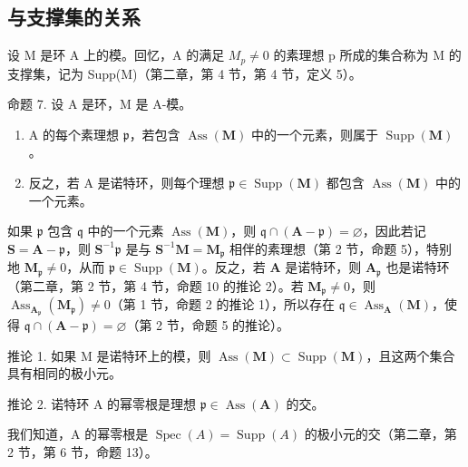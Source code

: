 \subsection{与支撑集的关系}

设 M 是环 A 上的模。回忆，A 的满足 \(M_{p} \neq 0\) 的素理想 p 所成的集合称为 M 的支撑集，记为 Supp(M)（第二章，第 4 节，第 4 节，定义 5）。

命题 7. 设 A 是环，M 是 A-模。

\begin{enumerate}
\def\labelenumi{(\roman{enumi})}
\item
A 的每个素理想 \(\mathfrak{p}\)，若包含 \(\operatorname{Ass}(\mathbf{M})\) 中的一个元素，则属于 \(\operatorname{Supp}(\mathbf{M})\)。
\item
反之，若 A 是诺特环，则每个理想 \(\mathfrak{p} \in \operatorname{Supp}(\mathbf{M})\) 都包含 \(\operatorname{Ass}(\mathbf{M})\) 中的一个元素。
\end{enumerate}

如果 \(\mathfrak{p}\) 包含 \(\mathfrak{q}\) 中的一个元素 \(\operatorname{Ass}(\mathbf{M})\)，则 \(\mathfrak{q} \cap (\mathbf{A} - \mathfrak{p}) = \varnothing\)，因此若记 \(\mathbf{S} = \mathbf{A} - \mathfrak{p}\)，则 \(\mathbf{S}^{-1}\mathfrak{p}\) 是与 \(\mathbf{S}^{-1}\mathbf{M} = \mathbf{M}_{\mathfrak{p}}\) 相伴的素理想（第 2 节，命题 5），特别地 \(\mathbf{M}_{\mathfrak{p}} \neq 0\)，从而 \(\mathfrak{p} \in \operatorname{Supp}(\mathbf{M})\)。反之，若 \(\mathbf{A}\) 是诺特环，则 \(\mathbf{A}_{\mathfrak{p}}\) 也是诺特环（第二章，第 2 节，第 4 节，命题 10 的推论 2）。若 \(\mathbf{M}_{\mathfrak{p}} \neq 0\)，则 \(\operatorname{Ass}_{\mathbf{A}_{\mathfrak{p}}}(\mathbf{M}_{\mathfrak{p}}) \neq 0\)（第 1 节，命题 2 的推论 1），所以存在 \(\mathfrak{q} \in \operatorname{Ass}_{\mathbf{A}}(\mathbf{M})\)，使得 \(\mathfrak{q} \cap (\mathbf{A} - \mathfrak{p}) = \varnothing\)（第 2 节，命题 5 的推论）。

推论 1. 如果 M 是诺特环上的模，则 \(\operatorname{Ass}(\mathbf{M}) \subset \operatorname{Supp}(\mathbf{M})\)，且这两个集合具有相同的极小元。

推论 2. 诺特环 A 的幂零根是理想 \(\mathfrak{p} \in \operatorname{Ass}(\mathbf{A})\) 的交。

我们知道，A 的幂零根是 \(\operatorname{Spec}(A) = \operatorname{Supp}(A)\) 的极小元的交（第二章，第 2 节，第 6 节，命题 13）。

